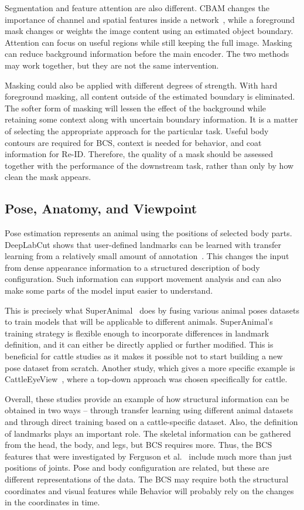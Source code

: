 Segmentation and feature attention are also different. CBAM changes the importance of channel and spatial features inside a network~\cite{cbam2018}, while a foreground mask changes or weights the image content using an estimated object boundary. Attention can focus on useful regions while still keeping the full image. Masking can reduce background information before the main encoder. The two methods may work together, but they are not the same intervention.

Masking could also be applied with different degrees of strength. With hard foreground masking, all content outside of the estimated boundary is eliminated. The softer form of masking will lessen the effect of the background while retaining some context along with uncertain boundary information. It is a matter of selecting the appropriate approach for the particular task. Useful body contours are required for BCS, context is needed for behavior, and coat information for Re-ID. Therefore, the quality of a mask should be assessed together with the performance of the downstream task, rather than only by how clean the mask appears.

\subsection{Pose, Anatomy, and Viewpoint}

Pose estimation represents an animal using the positions of selected body parts. DeepLabCut shows that user-defined landmarks can be learned with transfer learning from a relatively small amount of annotation~\cite{mathis2018deeplabcut}. This changes the input from dense appearance information to a structured description of body configuration. Such information can support movement analysis and can also make some parts of the model input easier to understand.

This is precisely what SuperAnimal~\cite{ye2024superanimal} does by fusing various animal poses datasets to train models that will be applicable to different animals. SuperAnimal's training strategy is flexible enough to incorporate differences in landmark definition, and it can either be directly applied or further modified. This is beneficial for cattle studies as it makes it possible not to start building a new pose dataset from scratch. Another study, which gives a more specific example is CattleEyeView~\cite{ong2023cattleeyeview}, where a top-down approach was chosen specifically for cattle.

Overall, these studies provide an example of how structural information can be obtained in two ways -- through transfer learning using different animal datasets and through direct training based on a cattle-specific dataset. Also, the definition of landmarks plays an important role. The skeletal information can be gathered from the head, the body, and legs, but BCS requires more. Thus, the BCS features that were investigated by Ferguson et al.~\cite{ferguson1994bcs} include much more than just positions of joints. Pose and body configuration are related, but these are different representations of the data. The BCS may require both the structural coordinates and visual features while Behavior will probably rely on the changes in the coordinates in time.

